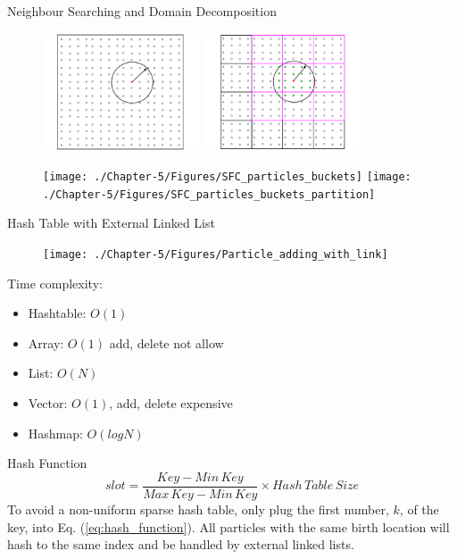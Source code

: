 \documentclass{beamer}
\begin{document}
\begin{frame}{Neighbour Searching and Domain Decomposition}
\begin{figure}
\flushleft
\includegraphics[width=0.415\textwidth]{./PPT/Neighor-searching-noBG}
\hfill
\includegraphics[width=0.415\textwidth]{./PPT/Neighbor-Search}
\end{figure}
\begin{figure}
\flushleft
\texttt{[image: ./Chapter-5/Figures/SFC\_particles\_buckets]}
\hfill
\texttt{[image: ./Chapter-5/Figures/SFC\_particles\_buckets\_partition]}
\end{figure}
\end{frame}

\begin{frame}{Hash Table with External Linked List}
\begin{minipage}{0.66 \textwidth}
\begin{figure}
\texttt{[image: ./Chapter-5/Figures/Particle\_adding\_with\_link]}
\end{figure}
\end{minipage}
\begin{minipage}{0.33 \textwidth} 
\small
Time complexity: 

\begin{itemize}
\item Hashtable: $O(1)$
\item Array: $O(1)$ add, delete not allow
\item List: $O(N)$
\item Vector: $O(1)$, add, delete expensive
\item Hashmap: $O(logN)$
\end{itemize}

\end{minipage}
\small
\begin{block}{Hash Function}
\begin{equation}
slot= \frac{Key - Min\,Key}{Max\,Key - Min\,Key} 
\times Hash\,Table\,Size 
\label{eq:hash_function}
\end{equation}
To avoid a non-uniform sparse hash table, only plug the first number, $k$, of the key, into Eq. (\ref{eq:hash_function}). All particles with the same birth location will hash to the same index and be handled by external linked lists.
\end{block}
\end{frame}
\end{document}
